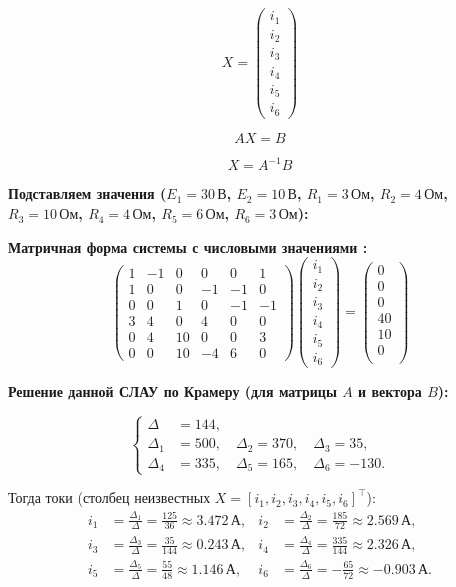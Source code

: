 $$X = \begin{pmatrix}
i_1 \\
i_2 \\
i_3 \\
i_4 \\
i_5 \\
i_6
\end{pmatrix}$$

$$A X = B$$

$$X = A^{-1} B$$

\textbf{Подставляем значения ($E_1=30\,\text{В}$, $E_2=10\,\text{В}$, $R_1=3\,\text{Ом}$, $R_2=4\,\text{Ом}$, $R_3=10\,\text{Ом}$, $R_4=4\,\text{Ом}$, $R_5=6\,\text{Ом}$, $R_6=3\,\text{Ом}$):}


\textbf{Матричная форма системы с числовыми значениями :}
$$\begin{pmatrix}
1 & -1 &  0 &  0 &  0 & 1 \\
 1 &  0 &  0 & -1 & -1 &  0 \\
 0 &  0 & 1 &  0 & -1 &  -1 \\
 3 & 4 & 0 &  4 &  0 &  0 \\
 0 &  4 & 10 & 0 & 0 &  3 \\
 0 &  0 &  10 &  -4 &  6 &  0
\end{pmatrix}
\begin{pmatrix}
i_1 \\
i_2 \\
i_3 \\
i_4 \\
 i_5 \\
i_6
\end{pmatrix}
=
\begin{pmatrix}
0 \\
0 \\
0 \\
40 \\
10 \\
0 \\
\end{pmatrix}$$


\textbf{Решение данной СЛАУ по Крамеру (для матрицы $A$ и вектора $B$):}

\[
\left\{\begin{aligned}
\Delta   &= 144,\\
\Delta_1 &= 500,\quad \Delta_2 = 370,\quad \Delta_3 = 35,\\
\Delta_4 &= 335,\quad \Delta_5 = 165,\quad \Delta_6 = -130.
\end{aligned}\right.
\]

Тогда токи (столбец неизвестных $X=[i_1,i_2,i_3,i_4,i_5,i_6]^\top$):
\[
\begin{aligned}
 i_1 &= \frac{\Delta_1}{\Delta} = \frac{125}{36} \approx 3.472\,\text{А}, &
 i_2 &= \frac{\Delta_2}{\Delta} = \frac{185}{72} \approx 2.569\,\text{А}, \\
 i_3 &= \frac{\Delta_3}{\Delta} = \frac{35}{144} \approx 0.243\,\text{А}, &
 i_4 &= \frac{\Delta_4}{\Delta} = \frac{335}{144} \approx 2.326\,\text{А}, \\
 i_5 &= \frac{\Delta_5}{\Delta} = \frac{55}{48} \approx 1.146\,\text{А}, &
 i_6 &= \frac{\Delta_6}{\Delta} = -\frac{65}{72} \approx -0.903\,\text{А}.
\end{aligned}
\]


